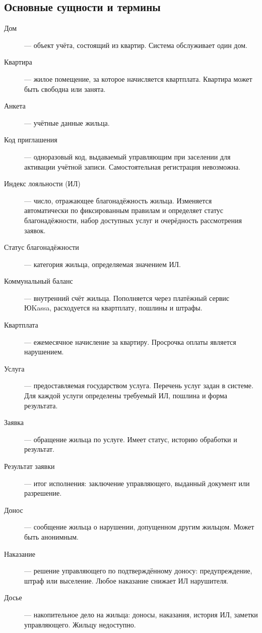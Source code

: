 \documentclass[12pt,a4paper]{article}
\begin{document}
\subsection{Основные сущности и термины}

\begin{description}
  \item[Дом] --- объект учёта, состоящий из квартир. Система обслуживает
    один дом.
  \item[Квартира] --- жилое помещение, за которое начисляется квартплата.
    Квартира может быть свободна или занята.
  \item[Анкета] --- учётные данные жильца.
  \item[Код приглашения] --- одноразовый код, выдаваемый управляющим при
    заселении для активации учётной записи. Самостоятельная регистрация
    невозможна.
  \item[Индекс лояльности (ИЛ)] --- число, отражающее благонадёжность
    жильца. Изменяется автоматически по фиксированным правилам и определяет
    статус благонадёжности, набор доступных услуг и очерёдность
    рассмотрения заявок.
  \item[Статус благонадёжности] --- категория жильца, определяемая
    значением ИЛ.
  \item[Коммунальный баланс] --- внутренний счёт жильца. Пополняется через
    платёжный сервис ЮKassa, расходуется на квартплату, пошлины и штрафы.
  \item[Квартплата] --- ежемесячное начисление за квартиру. Просрочка
    оплаты является нарушением.
  \item[Услуга] --- предоставляемая государством услуга. Перечень услуг
    задан в системе. Для каждой услуги определены требуемый ИЛ, пошлина и
    форма результата.
  \item[Заявка] --- обращение жильца по услуге. Имеет статус, историю
    обработки и результат.
  \item[Результат заявки] --- итог исполнения: заключение управляющего,
    выданный документ или разрешение.
  \item[Донос] --- сообщение жильца о нарушении, допущенном другим жильцом.
    Может быть анонимным.
  \item[Наказание] --- решение управляющего по подтверждённому доносу:
    предупреждение, штраф или выселение. Любое наказание снижает ИЛ
    нарушителя.
  \item[Досье] --- накопительное дело на жильца: доносы, наказания,
    история ИЛ, заметки управляющего. Жильцу недоступно.
\end{description}
\end{document}
